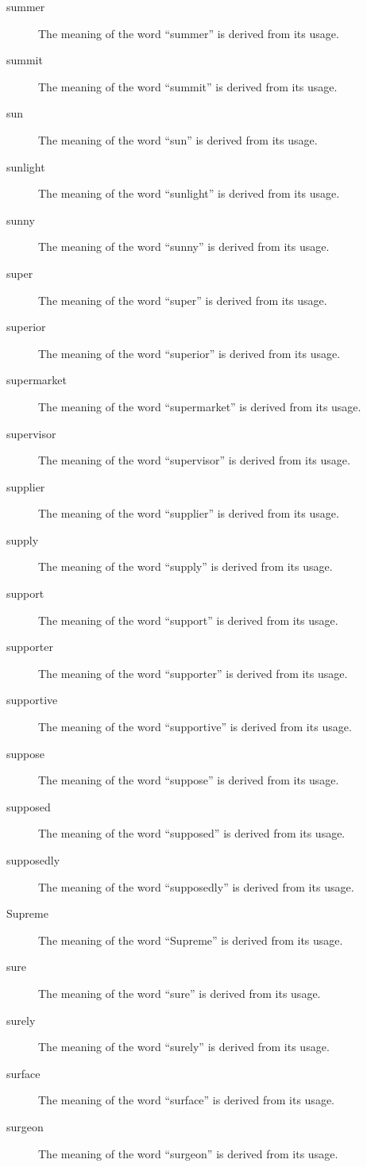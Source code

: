 \documentclass[12pt, letterpaper]{memoir}
\begin{document}
\begin{description}
\item[summer] The meaning of the word ``summer'' is derived from its usage.
\item[summit] The meaning of the word ``summit'' is derived from its usage.
\item[sun] The meaning of the word ``sun'' is derived from its usage.
\item[sunlight] The meaning of the word ``sunlight'' is derived from its usage.
\item[sunny] The meaning of the word ``sunny'' is derived from its usage.
\item[super] The meaning of the word ``super'' is derived from its usage.
\item[superior] The meaning of the word ``superior'' is derived from its usage.
\item[supermarket] The meaning of the word ``supermarket'' is derived from its usage.
\item[supervisor] The meaning of the word ``supervisor'' is derived from its usage.
\item[supplier] The meaning of the word ``supplier'' is derived from its usage.
\item[supply] The meaning of the word ``supply'' is derived from its usage.
\item[support] The meaning of the word ``support'' is derived from its usage.
\item[supporter] The meaning of the word ``supporter'' is derived from its usage.
\item[supportive] The meaning of the word ``supportive'' is derived from its usage.
\item[suppose] The meaning of the word ``suppose'' is derived from its usage.
\item[supposed] The meaning of the word ``supposed'' is derived from its usage.
\item[supposedly] The meaning of the word ``supposedly'' is derived from its usage.
\item[Supreme] The meaning of the word ``Supreme'' is derived from its usage.
\item[sure] The meaning of the word ``sure'' is derived from its usage.
\item[surely] The meaning of the word ``surely'' is derived from its usage.
\item[surface] The meaning of the word ``surface'' is derived from its usage.
\item[surgeon] The meaning of the word ``surgeon'' is derived from its usage.

\end{description}
\end{document}
